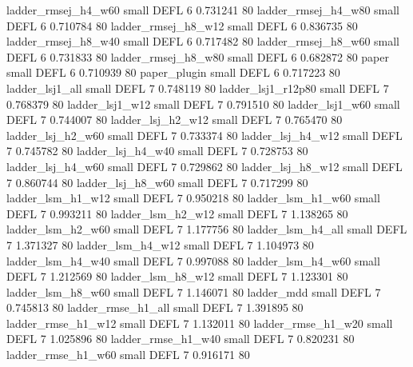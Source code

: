      ladder_rmsej_h4_w60      small     DEFL                 6 0.731241 80
     ladder_rmsej_h4_w80      small     DEFL                 6 0.710784 80
     ladder_rmsej_h8_w12      small     DEFL                 6 0.836735 80
     ladder_rmsej_h8_w40      small     DEFL                 6 0.717482 80
     ladder_rmsej_h8_w60      small     DEFL                 6 0.731833 80
     ladder_rmsej_h8_w80      small     DEFL                 6 0.682872 80
                   paper      small     DEFL                 6 0.710939 80
            paper_plugin      small     DEFL                 6 0.717223 80
         ladder_lsj1_all      small     DEFL                 7 0.748119 80
      ladder_lsj1_r12p80      small     DEFL                 7 0.768379 80
         ladder_lsj1_w12      small     DEFL                 7 0.791510 80
         ladder_lsj1_w60      small     DEFL                 7 0.744007 80
       ladder_lsj_h2_w12      small     DEFL                 7 0.765470 80
       ladder_lsj_h2_w60      small     DEFL                 7 0.733374 80
       ladder_lsj_h4_w12      small     DEFL                 7 0.745782 80
       ladder_lsj_h4_w40      small     DEFL                 7 0.728753 80
       ladder_lsj_h4_w60      small     DEFL                 7 0.729862 80
       ladder_lsj_h8_w12      small     DEFL                 7 0.860744 80
       ladder_lsj_h8_w60      small     DEFL                 7 0.717299 80
       ladder_lsm_h1_w12      small     DEFL                 7 0.950218 80
       ladder_lsm_h1_w60      small     DEFL                 7 0.993211 80
       ladder_lsm_h2_w12      small     DEFL                 7 1.138265 80
       ladder_lsm_h2_w60      small     DEFL                 7 1.177756 80
       ladder_lsm_h4_all      small     DEFL                 7 1.371327 80
       ladder_lsm_h4_w12      small     DEFL                 7 1.104973 80
       ladder_lsm_h4_w40      small     DEFL                 7 0.997088 80
       ladder_lsm_h4_w60      small     DEFL                 7 1.212569 80
       ladder_lsm_h8_w12      small     DEFL                 7 1.123301 80
       ladder_lsm_h8_w60      small     DEFL                 7 1.146071 80
              ladder_mdd      small     DEFL                 7 0.745813 80
      ladder_rmse_h1_all      small     DEFL                 7 1.391895 80
      ladder_rmse_h1_w12      small     DEFL                 7 1.132011 80
      ladder_rmse_h1_w20      small     DEFL                 7 1.025896 80
      ladder_rmse_h1_w40      small     DEFL                 7 0.820231 80
      ladder_rmse_h1_w60      small     DEFL                 7 0.916171 80
